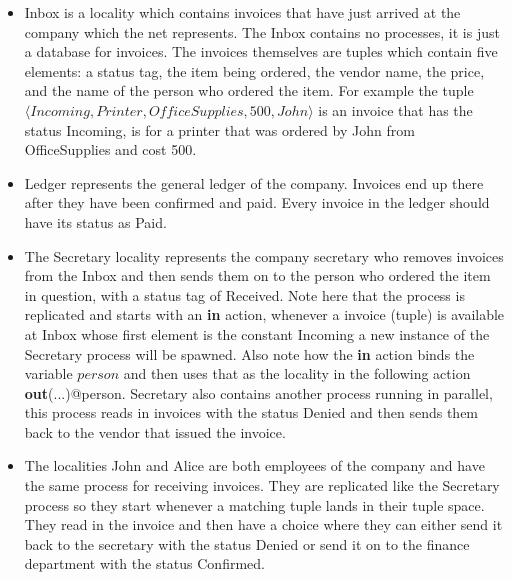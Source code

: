 	\begin{itemize}
		
		\item \textsf{Inbox} is a locality which contains invoices that have just 
		arrived at the company which the net represents. The \textsf{Inbox} 
		contains no processes, it is just a database for invoices. The invoices 
		themselves are tuples which contain five elements: a status tag, the item 
		being ordered, the vendor name, the price, and the name of the person who 
		ordered the item. For example the tuple $\langle Incoming, Printer, 
		OfficeSupplies, 500, John\rangle$ is an invoice that has the status 
		\textsf{Incoming}, is for a printer that was ordered by John from 
		OfficeSupplies and cost 500.
		
		\item \textsf{Ledger} represents the general ledger of the company. 
		Invoices end up there after they have been confirmed and paid. Every 
		invoice in the ledger should have its status as \textsf{Paid}.
		
		\item The \textsf{Secretary} locality represents the company secretary who 
		removes invoices from the \textsf{Inbox} and then sends them on to the 
		person who ordered the item in question, with a status tag of 
		\textsf{Received}. Note here that the process is replicated and starts 
		with an \textbf{in} action, whenever a invoice (tuple) is available at 
		\textsf{Inbox} whose first element is the constant \textsf{Incoming} a new 
		instance of the \textsf{Secretary} process will be spawned. Also note how 
		the \textbf{in} action binds the variable $person$ and then uses that as 
		the locality in the following action \textbf{out}(...)@person. 
		\textsf{Secretary} also contains another process running in parallel, this 
		process reads in invoices with the status \textsf{Denied} and then sends 
		them back to the vendor that issued the invoice.
		
		\item The localities \textsf{John} and \textsf{Alice} are both employees 
		of the company and have the same process for receiving invoices. They are 
		replicated like the \textsf{Secretary} process so they start whenever a 
		matching tuple lands in their tuple space. They read in the invoice and 
		then have a choice where they can either send it back to the secretary 
		with the status \textsf{Denied} or send it on to the finance department 
		with the status \textsf{Confirmed}.
		

\end{itemize}
